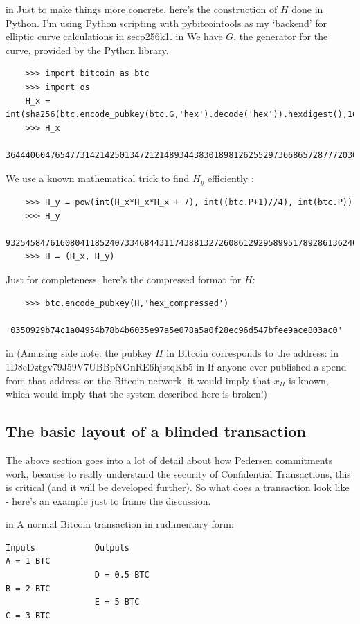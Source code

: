 \documentclass[10pt,a4paper]{article}
\begin{document}
 in \noindent
Just to make things more concrete, here's the construction of $H$ done in Python. I'm using Python scripting with pybitcointools \cite{pbtc} as my `backend' for elliptic curve calculations in secp256k1.
 in \noindent We have $G$, the generator for the curve, provided by the Python library.
\begin{verbatim}
	>>> import bitcoin as btc
	>>> import os
	H_x = int(sha256(btc.encode_pubkey(btc.G,'hex').decode('hex')).hexdigest(),16)
	>>> H_x
	36444060476547731421425013472121489344383018981262552973668657287772036414144L
\end{verbatim}

We use a known mathematical trick to find $H_y$ efficiently \cite{residue}:
\begin{verbatim}
	>>> H_y = pow(int(H_x*H_x*H_x + 7), int((btc.P+1)//4), int(btc.P))
	>>> H_y
	93254584761608041185240733468443117438813272608612929589951789286136240436011L
	>>> H = (H_x, H_y)
\end{verbatim}

Just for completeness, here's the compressed format for $H$:
\begin{verbatim}
	>>> btc.encode_pubkey(H,'hex_compressed')
	'0350929b74c1a04954b78b4b6035e97a5e078a5a0f28ec96d547bfee9ace803ac0'
\end{verbatim}

 in \noindent (Amusing side note: the pubkey $H$ in Bitcoin corresponds to the address:
 in \noindent 1D8eDztgv79J59V7UBBpNGnRE6hjstqKb5
 in \noindent If anyone ever published a spend from that address on the Bitcoin network, it would imply that $x_H$ is known, which would imply that the system described here is broken!)

\subsection{The basic layout of a blinded transaction}

The above section goes into a lot of detail about how Pedersen commitments work, because to really understand the security of Confidential Transactions, this is critical (and it will be developed further). So what does a transaction look like - here's an example just to frame the discussion.

 in \noindent A normal Bitcoin transaction in rudimentary form:
\begin{verbatim}
Inputs            Outputs
A = 1 BTC
                  D = 0.5 BTC
B = 2 BTC
                  E = 5 BTC
C = 3 BTC
\end{verbatim}
\end{document}
